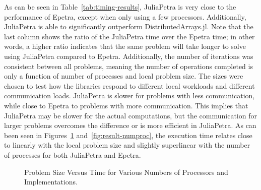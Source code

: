 \documentclass[acmsmall]{acmart}
\begin{document}
	As can be seen in Table~\ref{tab:timing-results}, JuliaPetra is very close to the performance of Epetra, except when only using a few processors.
	Additionally, JuliaPetra is able to significantly outperform DistributedArrays.jl.
	Note that the last column shows the ratio of the JuliaPetra time over the Epetra time; in other words, a higher ratio indicates that the same problem will take longer to solve using JuliaPetra compared to Epetra.
	Additionally, the number of iterations was consistent between all problems, meaning the number of operations completed is only a function of number of processes and local problem size.
	The sizes were chosen to test how the libraries respond to different local workloads and different communication loads.
	JuliaPetra is slower for problems with less communication, while close to Epetra to problems with more communication.
	This implies that JuliaPetra may be slower for the actual computations, but the communication for larger problems overcomes the difference or is more efficient in JuliaPetra.
	As can been seen in Figures~\ref{fig:result-localsize} and~\ref{fig:result-numproc}, the execution time relates close to linearly with the local problem size and slightly superlinear with the number of processes for both JuliaPetra and Epetra.
	
	\begin{figure}
		\caption{Problem Size Versus Time for Various Numbers of Processors and Implementations.}
		\label{fig:result-localsize}
	\end{figure}
	
\end{document}
